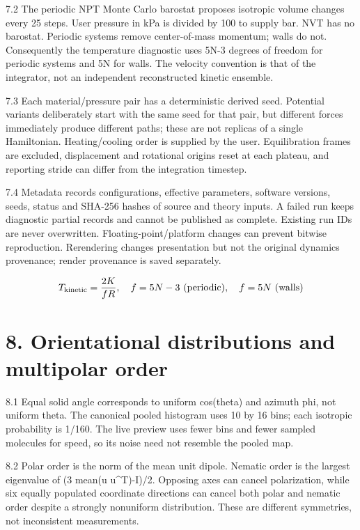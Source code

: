 \documentclass[11pt]{article}
\begin{document}
7.2 The periodic NPT Monte Carlo barostat proposes isotropic volume changes every 25 steps. User pressure in kPa is divided by 100 to supply bar. NVT has no barostat. Periodic systems remove center-of-mass momentum; walls do not. Consequently the temperature diagnostic uses 5N-3 degrees of freedom for periodic systems and 5N for walls. The velocity convention is that of the integrator, not an independent reconstructed kinetic ensemble.


7.3 Each material/pressure pair has a deterministic derived seed. Potential variants deliberately start with the same seed for that pair, but different forces immediately produce different paths; these are not replicas of a single Hamiltonian. Heating/cooling order is supplied by the user. Equilibration frames are excluded, displacement and rotational origins reset at each plateau, and reporting stride can differ from the integration timestep.


7.4 Metadata records configurations, effective parameters, software versions, seeds, status and SHA-256 hashes of source and theory inputs. A failed run keeps diagnostic partial records and cannot be published as complete. Existing run IDs are never overwritten. Floating-point/platform changes can prevent bitwise reproduction. Rerendering changes presentation but not the original dynamics provenance; render provenance is saved separately.


\[T_{\rm kinetic}=\frac{2K}{fR},\quad f=5N-3\ \mathrm{(periodic)},\quad f=5N\ \mathrm{(walls)}\]
\section*{8. Orientational distributions and multipolar order}
8.1 Equal solid angle corresponds to uniform cos(theta) and azimuth phi, not uniform theta. The canonical pooled histogram uses 10 by 16 bins; each isotropic probability is 1/160. The live preview uses fewer bins and fewer sampled molecules for speed, so its noise need not resemble the pooled map.


8.2 Polar order is the norm of the mean unit dipole. Nematic order is the largest eigenvalue of (3 mean(u u\textasciicircum{}T)-I)/2. Opposing axes can cancel polarization, while six equally populated coordinate directions can cancel both polar and nematic order despite a strongly nonuniform distribution. These are different symmetries, not inconsistent measurements.
\end{document}

